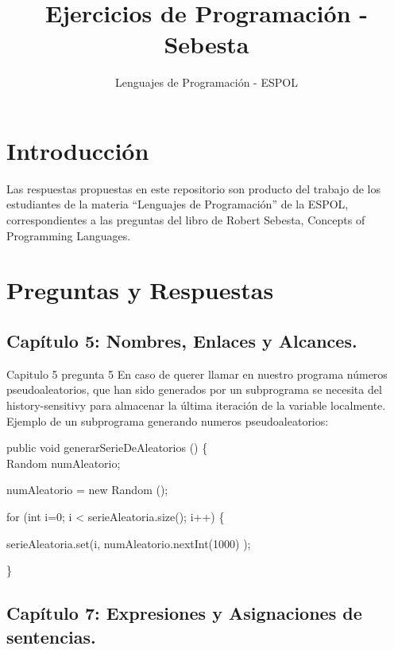 \documentclass[12pt,oneside]{article}
\title{Ejercicios de Programación - Sebesta}
\author{Lenguajes de Programación - ESPOL}
\begin{document}
\maketitle

\section{Introducción}
Las respuestas propuestas en este repositorio son producto del trabajo de los estudiantes de la materia ``Lenguajes de Programación'' de la ESPOL, correspondientes a las preguntas del libro de Robert Sebesta, Concepts of Programming Languages.

\section{Preguntas y Respuestas}

\subsection{Capítulo 5: Nombres, Enlaces y Alcances.}

%
Capitulo 5 pregunta 5
En caso de querer llamar en nuestro programa números pseudoaleatorios, que han sido generados por un subprograma se necesita del history-sensitivy para almacenar la última iteración de la variable localmente. 
Ejemplo de un subprograma generando numeros pseudoaleatorios:

 public void generarSerieDeAleatorios () \{  \\

        Random numAleatorio;

        numAleatorio = new Random ();

        for (int i=0; i < serieAleatoria.size(); i++)  \{

        serieAleatoria.set(i, numAleatorio.nextInt(1000) );

         \}
\subsection{Capítulo 7: Expresiones y Asignaciones de sentencias.}


%
%

\end{document}

